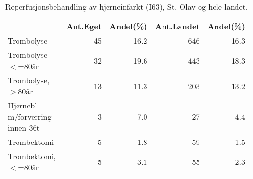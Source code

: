 \documentclass [norsk,a4paper,twoside]{article}\usepackage[]{graphicx}\usepackage[]{color}
\begin{document}
\begin{table}[ht]
\centering
\begin{tabular}{lrrrr}
  \hline
 & Ant.Eget & Andel(\%) & Ant.Landet & Andel(\%) \\ 
  \hline
Trombolyse & 45 & 16.2 & 646 & 16.3 \\ 
  Trombolyse $<$=80år & 32 & 19.6 & 443 & 18.3 \\ 
  Trombolyse, $>$80år & 13 & 11.3 & 203 & 13.2 \\ 
  Hjernebl m/forverring innen 36t & 3 & 7.0 & 27 & 4.4 \\ 
  Trombektomi & 5 & 1.8 & 59 & 1.5 \\ 
  Trombektomi, $<$=80år & 5 & 3.1 & 55 & 2.3 \\ 
   \hline
\end{tabular}
\caption{Reperfusjonsbehandling av hjerneinfarkt (I63), St. Olav og hele landet.} 
\label{tab:AkuttbehI63}
\end{table}





\end{document}
